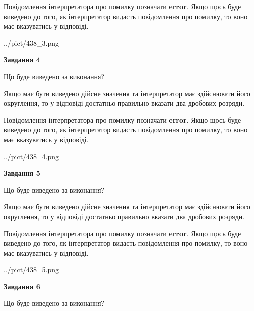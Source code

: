 \documentclass[12pt, ukrainian]{article}
\begin{document}
{\begin {Large}
Повідомлення інтерпретатора про помилку позначати \textbf{error}.
Якщо щось буде виведено до того, як інтерпретатор видасть повідомлення про помилку, 
то воно має вказуватись у відповіді. \par

\begin{center}
	{../pict/438_3.png}
\end{center}
\newpage

{\begin {center}\textbf{Завдання 4}\end {center}}\par
Що буде виведено за виконання? \par

Якщо має бути виведено дійсне значення та інтерпретатор має здійснювати його округлення, 
то у відповіді достатньо правильно вказати два дробових розряди.

Повідомлення інтерпретатора про помилку позначати \textbf{error}.
Якщо щось буде виведено до того, як інтерпретатор видасть повідомлення про помилку, 
то воно має вказуватись у відповіді. \par

\begin{center}
	{../pict/438_4.png}
\end{center}
\newpage

{\begin {center}\textbf{Завдання 5}\end {center}}\par
Що буде виведено за виконання? \par

Якщо має бути виведено дійсне значення та інтерпретатор має здійснювати його округлення, 
то у відповіді достатньо правильно вказати два дробових розряди.

Повідомлення інтерпретатора про помилку позначати \textbf{error}.
Якщо щось буде виведено до того, як інтерпретатор видасть повідомлення про помилку, 
то воно має вказуватись у відповіді. \par

\begin{center}
	{../pict/438_5.png}
\end{center}
\newpage

{\begin {center}\textbf{Завдання 6}\end {center}}\par
Що буде виведено за виконання? \par


\end{Large}}
\end{document}
